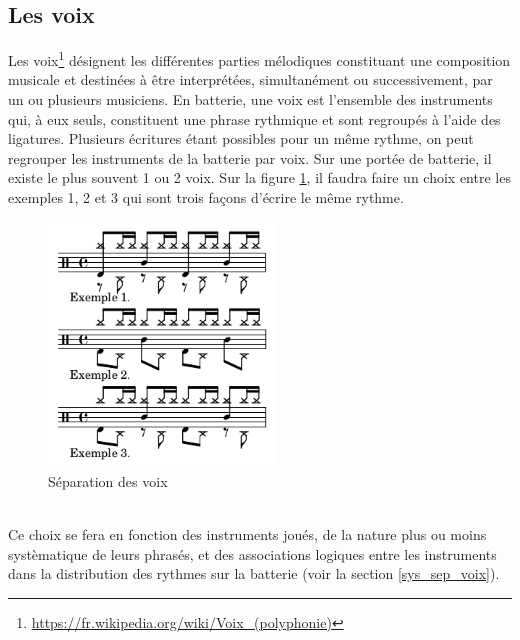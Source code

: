 \subsection*{Les voix}
Les voix\footnote{\url{https://fr.wikipedia.org/wiki/Voix_(polyphonie)}} 
désignent les différentes parties mélodiques constituant une composition musicale et destinées à être interprétées, simultanément ou successivement, par un ou plusieurs musiciens. 
En batterie, une voix est l’ensemble des instruments qui, à eux seuls, constituent une phrase rythmique et sont regroupés à l’aide des ligatures. 
Plusieurs écritures étant possibles pour un même rythme, on peut regrouper les instruments de la batterie par voix. Sur une portée de batterie, il existe le plus souvent 1 ou 2 voix. Sur la figure \ref{sep_voix}, il faudra faire un choix entre les exemples 1, 2 et 3 qui sont trois façons d’écrire le même rythme.
\begin{figure}[h]
	\centering
	\includegraphics[height=65mm, width=60mm]{z_images/3_methodes/0_notation_de_la_batterie/7_voix.png}
	\caption{Séparation des voix}
	\label{sep_voix}
\end{figure}\\
Ce choix se fera en fonction des instruments joués, de la nature plus ou moins systèmatique de leurs phrasés, et des associations logiques entre les instruments dans la distribution des rythmes sur la batterie (voir la section \ref{sys_sep_voix}).


